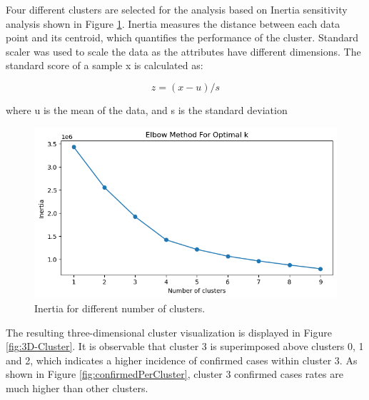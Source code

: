 \documentclass[sigconf,screen,nonacm]{acmart}
\begin{document}
Four different clusters are selected for the analysis based on Inertia sensitivity analysis shown in Figure \ref{fig:Intertia}. Inertia measures the distance between each data point and its centroid, which quantifies the performance of the cluster. Standard scaler was used to scale the data as the attributes have different dimensions. The standard score of a sample x is calculated as:

\begin{equation}
z = (x - u) / s
\end{equation}

\noindent where u is the mean of the data, and s is the standard deviation

\begin{figure}[H]
  \centering
  \includegraphics[width=\linewidth]{Figures/Interia.png}
  \caption{Inertia for different number of clusters.}
  \label{fig:Intertia}
\end{figure}

The resulting three-dimensional cluster visualization is displayed in Figure \ref{fig:3D-Cluster}. It is observable that cluster 3 is superimposed above clusters 0, 1 and 2, which indicates a higher incidence of confirmed cases within cluster 3. As shown in Figure \ref{fig:confirmedPerCluster}, cluster 3 confirmed cases rates are much higher than other clusters. 
\end{document}
